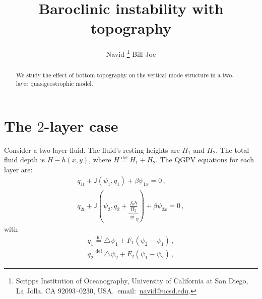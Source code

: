 \documentclass[10pt]{article}
\newcommand{\defn}{\ensuremath{\stackrel{\mathrm{def}}{=}}}
\newcommand{\com}{\, ,}
\newcommand{\andd}{\qquad \text{and} \qquad}
\newcommand{\h}{\eta}
\newcommand{\ao}{\alpha_1}
\newcommand{\at}{\alpha_2}
\renewcommand{\ao}{F_2}
\renewcommand{\at}{F_1}
\newcommand{\lap}{\triangle}
\newcommand{\J}{\mathsf{J}}
\begin{document}
\title{Baroclinic instability with topography}

\author{
Navid \thanks {Scripps Institution of Oceanography,
University of California at San Diego, La Jolla, CA
92093--0230, USA.~email:~\href{mailto:navid@ucsd.edu}{navid@ucsd.edu}.
} \qquad Bill \andd Joe}


\maketitle

\begin{abstract}
	We study the effect of bottom topography on the vertical mode structure in a two-layer quasigeostrophic model.
\end{abstract}


\section{The $2$-layer case}

Consider a two layer fluid. The fluid's resting heights are $H_1$ and $H_2$. The total fluid depth is $H-h(x,y)$, where $H\defn H_1+H_2$.  The QGPV equations for each layer are:\begin{subequations}
\begin{gather}
	q_{1t} + \J(\psi_1, q_1) + \beta \psi_{1x} = 0\com\label{eq:q1t} \\
	q_{2t} + \J(\psi_2, q_2 + \underbrace{\frac{f_0 h}{H_2}}_{\defn \h}) + \beta \psi_{2x} = 0\com\label{eq:q2t} 
\end{gather}\end{subequations}
with\begin{subequations}
\begin{gather}
	q_{1} \defn \lap\psi_1 + \at (\psi_2-\psi_1) \com\label{eq:q1def} \\
	q_{2} \defn \lap\psi_2 + \ao (\psi_1-\psi_2) \com\label{eq:q2def} 
\end{gather}\end{subequations}
\end{document}

